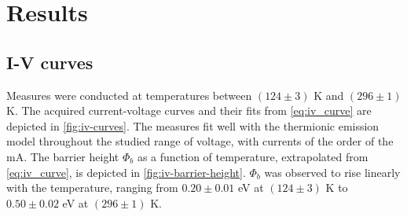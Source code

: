 \section{Results}
\subsection{I-V curves} \label{sec:results_iv}
Measures were conducted at temperatures between $(124 \pm 3)$ K and $(296\pm1)$ K. 
The acquired current-voltage curves and their fits from \autoref{eq:iv_curve} are depicted in \autoref{fig:iv-curves}.
The measures fit well with the thermionic emission model throughout the studied range of voltage, with currents of the order of the mA.
The barrier height $\Phi_b$ as a function of temperature, extrapolated from \autoref{eq:iv_curve}, is depicted in \autoref{fig:iv-barrier-height}.
$\Phi_b$ was observed to rise linearly with the temperature, ranging from $0.20 \pm 0.01$ eV at $(124 \pm 3)$ K to $0.50 \pm 0.02$ eV at $(296 \pm 1)$ K.


